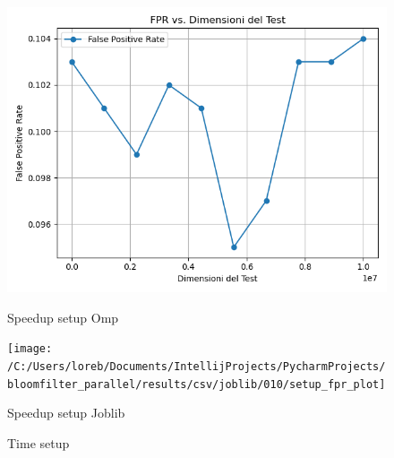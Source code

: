 \documentclass[11pt]{article}
\begin{document}
    \begin{figure}[H]
        \centering
        \includegraphics[width=\linewidth]{omp/010/setup_fpr_plot}
            \caption{Speedup setup Omp}\label{fig:010-setup_fpr_omp}
        \endminipage\hfill
        \texttt{[image: /C:/Users/loreb/Documents/IntellijProjects/PycharmProjects/bloomfilter\_parallel/results/csv/joblib/010/setup\_fpr\_plot]}
            \caption{Speedup setup Joblib}\label{fig:010-setup_fpr_joblib}
        \endminipage\hfill
        \caption{Time setup}
    \end{figure}
\end{document}
